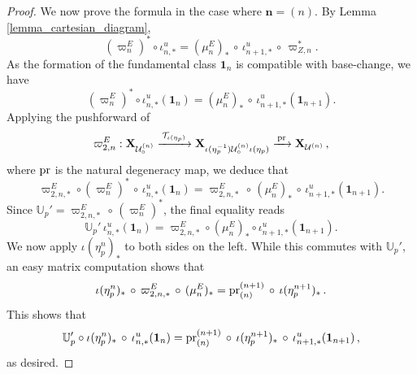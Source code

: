 \documentclass{amsart}
\numberwithin{equation}{section}
\begin{document}
\begin{proof}
  We now prove the formula in the case where ${\mathbf{n} } = (n)$. By Lemma \ref{lemma_cartesian_diagram}, 
   \[ (\varpi_n^{E})^\ast \circ \iota_{n,\ast}^u = (\mu_n^{E})_\ast\, \circ \,\iota_{n+1,\ast}^u\, \circ\,  \varpi_{Z,n}^{\ast}.\]
As the formation of the fundamental class $\mathbf{1}_n$ is compatible with base-change, we have
\[ (\varpi_n^{E})^* \circ \iota_{n,*}^u(\mathbf{1}_n) = (\mu_n^{E})_* \,\circ\, \iota_{n+1,*}^u (\mathbf{1}_{n+1}).\]
Applying the pushforward of \[\varpi_{2,n}^{E}:\mathbf{X}_{\mathcal{U}_{\circ}^{(n)}} \xrightarrow{\,\mathcal{T}_{\iota(\eta_p)}\,} \mathbf{X}_{\iota(\eta_p^{-1})\mathcal{U}_{\circ}^{(n)} \iota(\eta_p)} \xrightarrow{\,{\rm pr}\,} \mathbf{X}_{\mathcal{U}^{(n)}}\,, \] 
where ${\rm pr}$ is the natural degeneracy map, we deduce that 
\[ \varpi_{2,n,\ast}^{E} \circ (\varpi_n^{E})^* \,\circ\, \iota_{n,*}^u(\mathbf{1}_n) = \varpi_{2,n,\ast}^{E} \,\circ \,(\mu_n^{E})_* \,\circ\,\iota_{n+1,*}^u (\mathbf{1}_{n+1}).\]
Since $\mathbb{U}_p' = \varpi_{2,n,\ast}^{E}\, \circ \,(\varpi_n^{E})^*$, the final equality reads  
\[ \mathbb{U}_p' \, \iota_{n,*}^u(\mathbf{1}_n) = \varpi_{2,n, \ast}^{E} \circ (\mu_n^{E})_* \circ \iota_{n+1,*}^u (\mathbf{1}_{n+1}).\]
We now apply $\iota(\eta_p^n)_\ast$ to both sides on the left. While this commutes with $\mathbb{U}_p' $, an easy matrix computation shows that \[ \iota(\eta_p^n)_\ast \,\circ\,   \varpi_{2,n, \ast}^{E}\, \circ \,(\mu_n^{E})_* =   {\rm pr}^{(n+1)}_{(n)} \,\circ \,\iota(\eta_p^{n+1})_\ast \,. \]   
This shows that 
\[ \mathbb{U}_p' \circ \iota(\eta_p^n)_\ast \,\circ \,\iota_{n,*}^u(\mathbf{1}_n) = {\rm pr}^{(n+1)}_{(n)}\, \circ \,\iota(\eta_p^{n+1})_\ast \, \circ\, \iota_{n+1,*}^u (\mathbf{1}_{n+1})\,, \]
as desired.
\end{proof}
\end{document}
